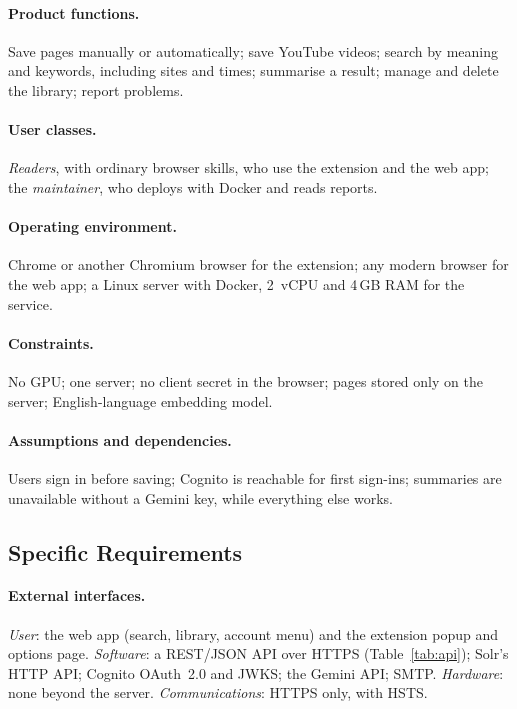 \paragraph{Product functions.} Save pages manually or automatically; save
YouTube videos; search by meaning and keywords, including sites and times;
summarise a result; manage and delete the library; report problems.

\paragraph{User classes.} \emph{Readers}, with ordinary browser skills, who
use the extension and the web app; the \emph{maintainer}, who deploys with
Docker and reads reports.

\paragraph{Operating environment.} Chrome or another Chromium browser for the
extension; any modern browser for the web app; a Linux server with Docker,
2~vCPU and 4\,GB RAM for the service.

\paragraph{Constraints.} No GPU; one server; no client secret in the browser;
pages stored only on the server; English-language embedding model.

\paragraph{Assumptions and dependencies.} Users sign in before saving;
Cognito is reachable for first sign-ins; summaries are unavailable without a
Gemini key, while everything else works.

\subsection{Specific Requirements}

\paragraph{External interfaces.} \emph{User}: the web app (search, library,
account menu) and the extension popup and options page. \emph{Software}: a
REST/JSON API over HTTPS (Table~\ref{tab:api}); Solr's HTTP API; Cognito
OAuth~2.0 and JWKS; the Gemini API; SMTP. \emph{Hardware}: none beyond the
server. \emph{Communications}: HTTPS only, with HSTS.

